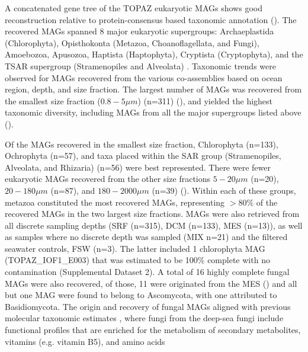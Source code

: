 \documentclass[12pt]{article}
\numberwithin{equation}{section}
\begin{document}
A concatenated gene tree of the TOPAZ eukaryotic MAGs shows good reconstruction relative to protein-consensus based taxonomic annotation (). The recovered MAGs spanned 8 major eukaryotic supergroups: Archaeplastida (Chlorophyta), Opisthokonta (Metazoa, Choanoflagellata, and Fungi), Amoebozoa, Apusozoa, Haptista (Haptophyta), Cryptista (Cryptophyta), and the TSAR supergroup (Stramenopiles and Alveolata) \citep{Burki_2020}. Taxonomic trends were observed for MAGs recovered from the various co-assemblies based on ocean region, depth, and size fraction. The largest number of MAGs was recovered from the smallest size fraction ($0.8-5 \mu m$) (n=311) (), and yielded the highest taxonomic diversity, including MAGs from all the major supergroups listed above (). 



Of the MAGs recovered in the smallest size fraction,  Chlorophyta (n=133), Ochrophyta (n=57), and taxa placed within the SAR group (Stramenopiles, Alveolata, and Rhizaria) (n=56) were best represented. There were fewer eukaryotic MAGs recovered from the other size fractions $5-20\mu m$ (n=20), $20-180 \mu m$ (n=87), and $180-2000\mu m$ (n=39) (). Within each of these groups, metazoa constituted the most recovered MAGs, representing $>80\%$ of the recovered MAGs in the two largest size fractions. MAGs were also retrieved from all discrete sampling depths (SRF (n=315), DCM (n=133), MES (n=13)), as well as samples where no discrete depth was sampled (MIX n=21) and the filtered seawater controls, FSW (n=3). The latter included 1 chlorophyta MAG (TOPAZ\_IOF1\_E003) that was estimated to be 100\% complete with no contamination (Supplemental Dataset 2). A total of 16 highly complete fungal MAGs were also recovered, of those, 11 were originated from the MES () and all but one MAG were found to belong to Ascomycota, with one attributed to Basidiomycota. The origin and recovery of fungal MAGs aligned with previous molecular taxonomic estimates \citep{Morales_2019,Pernice_2015,Edgcomb_2010}, where fungi from the deep-sea fungi include functional profiles that are enriched for the metabolism of secondary metabolites, vitamins (e.g. vitamin B5), and amino acids \citep{Morales_2019,DAMARE2006172} 
\end{document}
